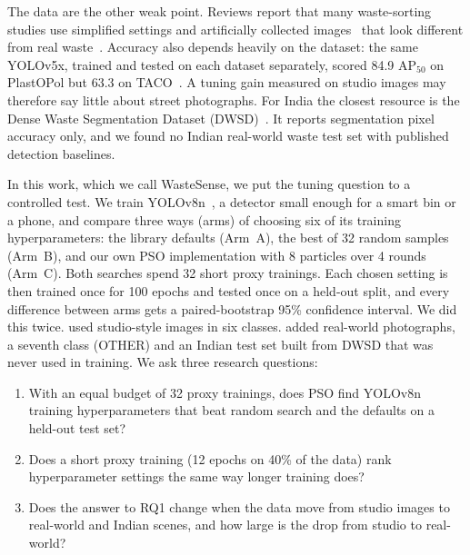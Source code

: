 The data are the other weak point. Reviews report that many waste-sorting studies use simplified settings and artificially collected images~\cite{lu2022computer} that look different from real waste~\cite{fang2023artificial}. Accuracy also depends heavily on the dataset: the same YOLOv5x, trained and tested on each dataset separately, scored 84.9 AP$_{50}$ on PlastOPol but 63.3 on TACO~\cite{cordova2022litter}. A tuning gain measured on studio images may therefore say little about street photographs. For India the closest resource is the Dense Waste Segmentation Dataset (DWSD)~\cite{ali2025dwsd}. It reports segmentation pixel accuracy only, and we found no Indian real-world waste test set with published detection baselines.

In this work, which we call WasteSense, we put the tuning question to a controlled test. We train YOLOv8n~\cite{jocher2023ultralytics}, a detector small enough for a smart bin or a phone, and compare three ways (arms) of choosing six of its training hyperparameters: the library defaults (Arm~A), the best of 32 random samples (Arm~B), and our own PSO implementation with 8 particles over 4 rounds (Arm~C). Both searches spend 32 short proxy trainings. Each chosen setting is then trained once for 100 epochs and tested once on a held-out split, and every difference between arms gets a paired-bootstrap 95\% confidence interval. We did this twice. \genone used studio-style images in six classes. \gentwo added real-world photographs, a seventh class (OTHER) and an Indian test set built from DWSD that was never used in training. We ask three research questions:
\begin{enumerate}
\item[RQ1:] With an equal budget of 32 proxy trainings, does PSO find YOLOv8n training hyperparameters that beat random search and the defaults on a held-out test set?
\item[RQ2:] Does a short proxy training (12 epochs on 40\% of the data) rank hyperparameter settings the same way longer training does?
\item[RQ3:] Does the answer to RQ1 change when the data move from studio images to real-world and Indian scenes, and how large is the drop from studio to real-world?
\end{enumerate}

